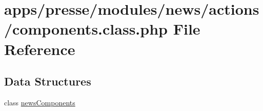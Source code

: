\hypertarget{presse_2modules_2news_2actions_2components_8class_8php}{\section{apps/presse/modules/news/actions/components.class.\-php File Reference}
\label{presse_2modules_2news_2actions_2components_8class_8php}
}
\subsection*{Data Structures}
\begin{DoxyCompactItemize}
\item 
class \hyperlink{classnews_components}{news\-Components}
\end{DoxyCompactItemize}
